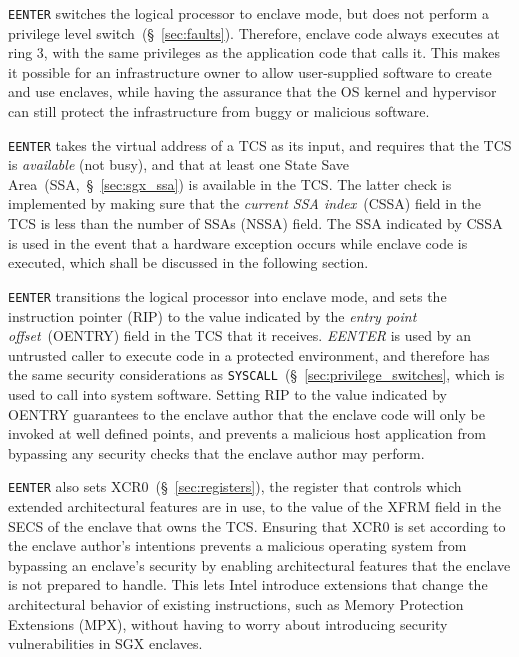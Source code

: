 \texttt{EENTER} switches the logical processor to enclave mode, but does not
perform a privilege level switch~(\S~\ref{sec:faults}). Therefore, enclave code
always executes at ring 3, with the same privileges as the application code
that calls it. This makes it possible for an infrastructure owner to allow
user-supplied software to create and use enclaves, while having the assurance
that the OS kernel and hypervisor can still protect the infrastructure from
buggy or malicious software.


\texttt{EENTER} takes the virtual address of a TCS as its input, and requires
that the TCS is \textit{available} (not busy), and that at least one State Save
Area~(SSA,~\S~\ref{sec:sgx_ssa}) is available in the TCS. The latter check is
implemented by making sure that the \textit{current SSA index}~(CSSA) field in
the TCS is less than the number of SSAs (NSSA) field. The SSA indicated by CSSA
is used in the event that a hardware exception occurs while enclave code is
executed, which shall be discussed in the following section.

\texttt{EENTER} transitions the logical processor into enclave mode, and sets
the instruction pointer (RIP) to the value indicated by the \textit{entry point
offset}~(OENTRY) field in the TCS that it receives. \textit{EENTER} is used by
an untrusted caller to execute code in a protected environment, and therefore
has the same security considerations as
\texttt{SYSCALL}~(\S~\ref{sec:privilege_switches}, which is used to call into
system software. Setting RIP to the value indicated by OENTRY guarantees to the
enclave author that the enclave code will only be invoked at well defined
points, and prevents a malicious host application from bypassing any security
checks that the enclave author may perform.


\texttt{EENTER} also sets XCR0~(\S~\ref{sec:registers}), the register that
controls which extended architectural features are in use, to the value of the
XFRM field in the SECS of the enclave that owns the TCS. Ensuring that XCR0 is
set according to the enclave author's intentions prevents a malicious operating
system from bypassing an enclave's security by enabling architectural features
that the enclave is not prepared to handle. This lets Intel introduce
extensions that change the architectural behavior of existing instructions,
such as Memory Protection Extensions (MPX), without having to worry about
introducing security vulnerabilities in SGX enclaves.

